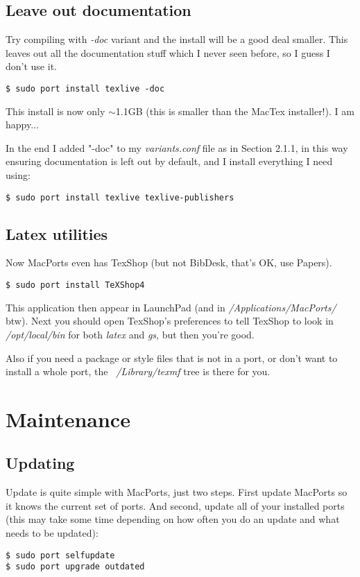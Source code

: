 \documentclass[11pt, A4paper]{article}
\begin{document}
\subsection{Leave out documentation}
Try compiling with \textit{-doc} variant and the install will be a good deal smaller. This leaves out all the documentation stuff which I never seen before, so I guess I don't use it.
\begin{lstlisting}[style=Bash]
$ sudo port install texlive -doc
\end{lstlisting}
This install is now only $\sim$1.1GB (this is smaller than the MacTex installer!). I am happy...

In the end I added "-doc" to my {\it variants.conf} file as in Section 2.1.1, in this way ensuring documentation is left out by default, and I install everything I need using:
\begin{lstlisting}[style=Bash]
$ sudo port install texlive texlive-publishers
\end{lstlisting}

\subsection{Latex utilities}
Now MacPorts even has TexShop (but not BibDesk, that's OK, use Papers). 
\begin{lstlisting}[style=Bash]
$ sudo port install TeXShop4
\end{lstlisting}
This application then appear in LaunchPad (and in \textit{/Applications/MacPorts/} btw). Next you should open TexShop's preferences to tell TexShop to look in \textit{/opt/local/bin} for both \textit{latex} and \textit{gs}, but then you're good. 

Also if you need a package or style files that is not in a port, or don't want to install a whole port, the \textit{~/Library/texmf} tree is there for you.



%
%
\section{Maintenance}

\subsection{Updating}
Update is quite simple with MacPorts, just two steps. First update MacPorts so it knows the current set of ports. And second, update all of your installed ports (this may take some time depending on how often you do an update and what needs to be updated):
\begin{lstlisting}[style=Bash]
$ sudo port selfupdate
$ sudo port upgrade outdated
\end{lstlisting}
\end{document}
